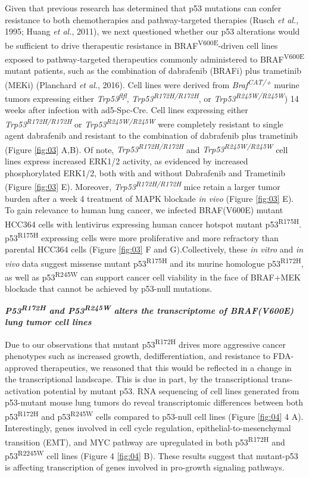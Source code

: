 Given that previous research has determined that p53 mutations can confer resistance to both chemotherapies and pathway-targeted therapies (Rusch \emph{et al.}, 1995; Huang \emph{et al.}, 2011), we next questioned whether our p53 alterations would be sufficient to drive therapeutic resistance in BRAF\textsuperscript{V600E}-driven cell lines exposed to pathway-targeted therapeutics commonly administered to BRAF\textsuperscript{V600E} mutant patients, such as the combination of dabrafenib (BRAFi) plus trametinib (MEKi) (Planchard \emph{et al.}, 2016). Cell lines were derived from \emph{Braf\textsuperscript{CAT/+}} murine tumors expressing either \emph{Trp53\textsuperscript{flfl}}, \emph{Trp53\textsuperscript{R172H/R172H}}, or \emph{Trp53\textsuperscript{R245W/R245W}}) 14 weeks after infection with ad5-Spc-Cre. Cell lines expressing either \emph{Trp53\textsuperscript{R172H/R172H}} or \emph{Trp53\textsuperscript{R245W/R245W}} were completely resistant to single agent dabrafenib and resistant to the combination of dabrafenib plus trametinib (Figure \ref{fig:03} A,B). Of note, \emph{Trp53\textsuperscript{R172H/R172H}} and \emph{Trp53\textsuperscript{R245W/R245W}} cell lines express increased ERK1/2 activity, as evidenced by increased phosphorylated ERK1/2, both with and without Dabrafenib and Trametinib (Figure \ref{fig:03} E). Moreover, \emph{Trp53\textsuperscript{R172H/R172H}} mice retain a larger tumor burden after a week 4 treatment of MAPK blockade \emph{in vivo} (Figure \ref{fig:03} E). To gain relevance to human lung cancer, we infected BRAF(V600E) mutant HCC364 cells with lentivirus expressing human cancer hotspot mutant p53\textsuperscript{R175H}. p53\textsuperscript{R175H} expressing cells were more proliferative and more refractory than parental HCC364 cells (Figure \ref{fig:03} F and G).Collectively, these \emph{in vitro} and \emph{in vivo} data suggest missense mutant p53\textsuperscript{R175H} and its murine homologue p53\textsuperscript{R172H}, as well as p53\textsuperscript{R245W} can support cancer cell viability in the face of BRAF+MEK blockade that cannot be achieved by p53-null mutations.

\emph{\textbf{P53\textsuperscript{R172H} and P53\textsuperscript{R245W} alters the transcriptome of BRAF(V600E) lung tumor cell lines}}

Due to our observations that mutant p53\textsuperscript{R172H} drives more aggressive cancer phenotypes such as increased growth, dedifferentiation, and resistance to FDA-approved therapeutics, we reasoned that this would be reflected in a change in the transcriptional landscape. This is due in part, by the transcriptional trans-activation potential by mutant p53. RNA sequencing of cell lines generated from p53-mutant mouse lung tumors do reveal transcriptomic differences between both p53\textsuperscript{R172H} and p53\textsuperscript{R245W} cells compared to p53-null cell lines (Figure \ref{fig:04} 4 A). Interestingly, genes involved in cell cycle regulation, epithelial-to-mesenchymal transition (EMT), and MYC pathway are upregulated in both p53\textsuperscript{R172H} and p53\textsuperscript{R2245W} cell lines (Figure 4 \ref{fig:04} B). These results suggest that mutant-p53 is affecting transcription of genes involved in pro-growth signaling pathways.

